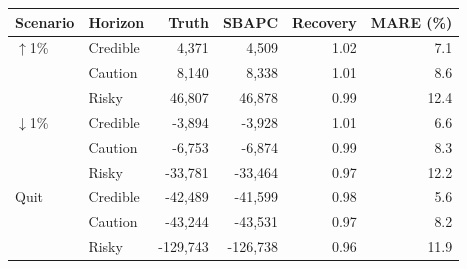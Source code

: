 \begingroup
\renewcommand{\arraystretch}{1.08}
\setlength{\tabcolsep}{4pt}
\begin{tabular}{llrrrr}
\toprule
Scenario & Horizon & Truth & SBAPC & Recovery & MARE (\%) \\
\midrule
$\uparrow$1\% & Credible & 4,371 & 4,509 & 1.02 & 7.1 \\
 & Caution & 8,140 & 8,338 & 1.01 & 8.6 \\
 & Risky & 46,807 & 46,878 & 0.99 & 12.4 \\
\midrule
$\downarrow$1\% & Credible & -3,894 & -3,928 & 1.01 & 6.6 \\
 & Caution & -6,753 & -6,874 & 0.99 & 8.3 \\
 & Risky & -33,781 & -33,464 & 0.97 & 12.2 \\
\midrule
Quit & Credible & -42,489 & -41,599 & 0.98 & 5.6 \\
 & Caution & -43,244 & -43,531 & 0.97 & 8.2 \\
 & Risky & -129,743 & -126,738 & 0.96 & 11.9 \\
\bottomrule
\end{tabular}
\endgroup
